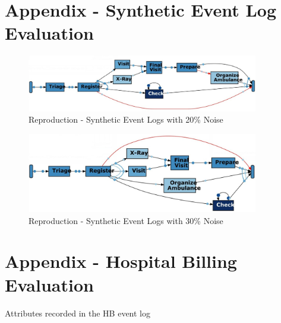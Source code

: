 \section{Appendix - Synthetic Event Log Evaluation}


\begin{figure}[H]
\begin{center}
\includegraphics[width=0.9\textwidth]{Chapters/Graphics_Paper/Syn20NoiseReprod.jpg}
\caption{Reproduction - Synthetic Event Logs with 20\% Noise} 
\end{center}
\end{figure}

\begin{figure}[H]
\begin{center}
\includegraphics[width=0.9\textwidth]{Chapters/Graphics_Paper/Syn30NoiseReprod.jpg}
\caption{Reproduction - Synthetic Event Logs with 30\% Noise} 
\end{center}
\end{figure}

\section{Appendix - Hospital Billing Evaluation}


\begin{table}[H]
\caption{Attributes recorded in the HB event log} 
\end{table}

